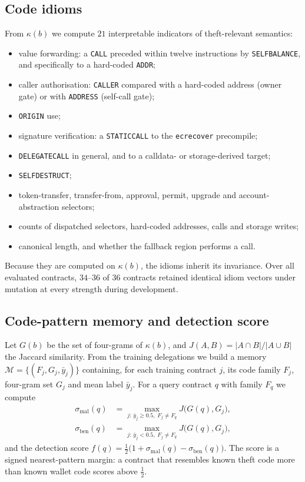 \subsection{Code idioms}
From $\kappa(b)$ we compute $21$ interpretable indicators of theft-relevant semantics:
\begin{itemize}
\item value forwarding: a \texttt{CALL} preceded within twelve instructions by \texttt{SELFBALANCE}, and specifically to a hard-coded \texttt{ADDR};
\item caller authorisation: \texttt{CALLER} compared with a hard-coded address (owner gate) or with \texttt{ADDRESS} (self-call gate);
\item \texttt{ORIGIN} use;
\item signature verification: a \texttt{STATICCALL} to the \texttt{ecrecover} precompile;
\item \texttt{DELEGATECALL} in general, and to a calldata- or storage-derived target;
\item \texttt{SELFDESTRUCT};
\item token-transfer, transfer-from, approval, permit, upgrade and account-abstraction selectors;
\item counts of dispatched selectors, hard-coded addresses, calls and storage writes;
\item canonical length, and whether the fallback region performs a call.
\end{itemize}
Because they are computed on $\kappa(b)$, the idioms inherit its invariance. Over all evaluated contracts, $34$--$36$ of $36$ contracts retained identical idiom vectors under mutation at every strength during development.

\subsection{Code-pattern memory and detection score}
\label{sec:memory}
Let $G(b)$ be the set of four-grams of $\kappa(b)$, and $J(A,B)=|A\cap B|/|A\cup B|$ the Jaccard similarity. From the training delegations we build a memory $\mathcal{M}=\{(F_j,G_j,\bar y_j)\}$ containing, for each training contract $j$, its code family $F_j$, four-gram set $G_j$ and mean label $\bar y_j$. For a query contract $q$ with family $F_q$ we compute
\begin{align}
\sigma_{\mathrm{mal}}(q)&=\max_{j:\,\bar y_j\ge 0.5,\;F_j\ne F_q} J\big(G(q),G_j\big),\\
\sigma_{\mathrm{ben}}(q)&=\max_{j:\,\bar y_j< 0.5,\;F_j\ne F_q} J\big(G(q),G_j\big),
\end{align}
and the detection score $f(q)=\tfrac{1}{2}\big(1+\sigma_{\mathrm{mal}}(q)-\sigma_{\mathrm{ben}}(q)\big)$. The score is a signed nearest-pattern margin: a contract that resembles known theft code more than known wallet code scores above $\tfrac12$.

